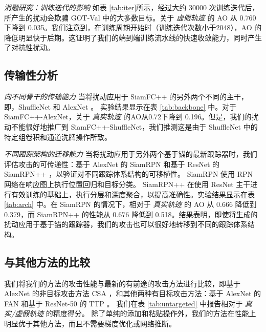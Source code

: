 \textit{消融研究：训练迭代的影响} 如表 \ref{tab:iter}所示，经过大约 30000 次训练迭代后，所产生的扰动会欺骗 GOT-Val 中的大多数目标。关于 \textit{虚假轨迹} 的 AO 从 0.760 下降到 0.035。我们注意到，在训练周期开始时（训练迭代次数小于2048），AO 的降低明显快于后期。这证明了我们的端到端训练流水线的快速收敛能力，同时产生了对抗性扰动。

\subsection{传输性分析}

\textit{向不同骨干的传输能力} 当将扰动应用于 SiamFC++ 的另外两个不同的主干，即，ShuffleNet \cite{ShuffleNet} 和 AlexNet \cite{AlexNet}。
实验结果显示在表 \ref{tab:backbone} 中。对于 SiamFC++-AlexNet，关于 \textit{真实轨迹} 的AO从0.72下降到 0.196。但是，我们的扰动不能很好地推广到 SiamFC++-ShuffleNet，我们推测这是由于 ShuffleNet 中的特定组卷积和通道洗牌操作所致。

\textit{不同跟踪架构的迁移能力} 当将扰动应用于另外两个基于锚的最新跟踪器时，我们评估攻击的可传递性：基于 AlexNet 的 SiamRPN \cite{SiamRPN} 和基于 ResNet 的 SiamRPN++ \cite{SiamRPN++}，以验证对不同跟踪体系结构的可移植性。
SiamRPN 使用 RPN 网络在响应图上执行位置回归和目标分类。 SiamRPN++ 在使用 ResNet 主干进行有效训练的基础上，执行分层和深度聚合，以提高准确性。实验结果显示在表 \ref{tab:arch} 中。在 SiamRPN 的情况下，相对于 \textit{真实轨迹} 的 AO 从 0.666 降低到 0.379，而 SiamRPN++ 的性能从 0.676 降低到 0.518。结果表明，即使将生成的扰动应用于基于锚的跟踪器，我们的攻击也可以很好地转移到不同的跟踪体系结构。

\subsection{与其他方法的比较}

我们将我们的方法的攻击性能与最新的有前途的攻击方法进行比较，即基于 AlexNet 的非目标攻击方法 CSA \cite{CSA}，和其他两种有目标攻击方法：基于 AlexNet 的 FAN \cite{FAN} 和基于 ResNet-50 的 TTP \cite{TTP}。
我们在表 \ref{tab:untargeted} 中报告相对于 \textit{真实/虚假轨迹} 的精度得分。
除了单纯的添加和粘贴操作外，我们的方法在性能上明显优于其他方法，而且不需要梯度优化或网络推断。

